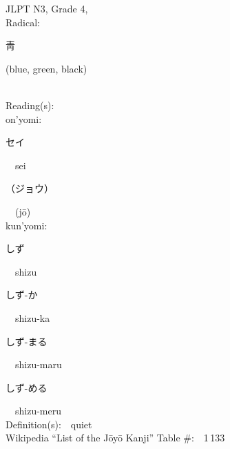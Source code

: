 \begin{multicols}{2}
{JLPT N3, Grade 4, \\Radical:\ \ {\begin{CJK}{UTF8}{min} 靑 \end{CJK}} (blue, green, black) } \\
Reading(s):\ \ \\
{\hspace*{1em}}on'yomi:\ \ \\
{\hspace*{2em}}{\begin{CJK}{UTF8}{min} セイ \end{CJK}}\ \ sei\ \ \\
{\hspace*{2em}}{\begin{CJK}{UTF8}{min} （ジョウ） \end{CJK}}\ \ (j\=o)\ \ \\
{\hspace*{1em}}kun'yomi:\ \ \\
{\hspace*{2em}}{\begin{CJK}{UTF8}{min} しず \end{CJK}}\ \ shizu\ \ \\
{\hspace*{2em}}{\begin{CJK}{UTF8}{min} しず-か \end{CJK}}\ \ shizu-ka\ \ \\
{\hspace*{2em}}{\begin{CJK}{UTF8}{min} しず-まる \end{CJK}}\ \ shizu-maru\ \ \\
{\hspace*{2em}}{\begin{CJK}{UTF8}{min} しず-める \end{CJK}}\ \ shizu-meru\ \ \\
Definition(s):\ \ quiet \\
Wikipedia ``List of the J\=oy\=o Kanji'' Table \#:\ \ 1\,133 \\
\ \ \\
\end{multicols}



